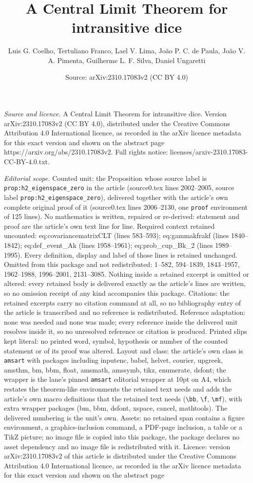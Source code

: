 \documentclass[10pt,a4paper]{amsart}
\title[A Central Limit Theorem for intransitive dice]{A Central Limit Theorem for intransitive dice}
\author{Luis G. Coelho, Tertuliano Franco, Lael V. Lima, Jo\~ao P. C. de Paula, Jo\~ao V. A. Pimenta, Guilherme L. F. Silva, Daniel Ungaretti}
\date{Source: arXiv:2310.17083v2 (CC BY 4.0)}
\begin{document}
\maketitle

\noindent\emph{Source and licence.} A Central Limit Theorem for intransitive dice. Version arXiv:2310.17083v2 (CC BY 4.0), distributed under the Creative Commons Attribution 4.0 International licence, as recorded in the arXiv licence metadata for this exact version and shown on the abstract page https://arxiv.org/abs/2310.17083v2. Full rights notice: licenses/arxiv-2310.17083-CC-BY-4.0.txt.\par\smallskip

\noindent\textit{Editorial scope.} Counted unit: the Proposition whose source label is \texttt{prop:h2\_eigenspace\_zero} in the article (source0.tex lines 2002--2005, source label \texttt{prop:h2\_eigenspace\_zero}), delivered together with the article's own complete original proof of it (source0.tex lines 2006--2130, one \texttt{proof} environment of 125 lines). No mathematics is written, repaired or re-derived: statement and proof are the article's own text line for line. Required context retained uncounted: eq:covariancematrixCLT (lines 583--593); eq:gammakfrakf (lines 1840--1842); eq:def\_event\_Ak (lines 1958--1961); eq:prob\_cup\_Bk\_2 (lines 1989--1995). Every definition, display and label of those lines is retained unchanged. Omitted from this package and not redistributed: 1--582, 594--1839, 1843--1957, 1962--1988, 1996--2001, 2131--3085. Nothing inside a retained excerpt is omitted or altered: every retained body is delivered exactly as the article's lines are written, so no omission receipt of any kind accompanies this package. Citations: the retained excerpts carry no citation command at all, so no bibliography entry of the article is transcribed and no reference is redistributed. Reference adaptation: none was needed and none was made; every reference inside the delivered unit resolves inside it, so no unresolved reference or citation is produced. Printed slips kept literal: no printed word, symbol, hypothesis or number of the counted statement or of its proof was altered. Layout and class: the article's own class is \texttt{amsart} with packages including inputenc, babel, helvet, courier, upgreek, amsthm, bm, bbm, float, amsmath, amssymb, tikz, enumerate, dsfont; the wrapper is the lane's pinned \texttt{amsart} editorial wrapper at 10pt on A4, which restates the theorem-like environments the retained text needs and adds the article's own macro definitions that the retained text needs (\texttt{\textbackslash bb}, \texttt{\textbackslash f}, \texttt{\textbackslash mf}), with extra wrapper packages (bm, bbm, dsfont, xspace, cancel, mathtools). The delivered numbering is the unit's own. Assets: no retained span contains a figure environment, a graphics-inclusion command, a PDF-page inclusion, a table or a TikZ picture; no image file is copied into this package, the package declares no asset dependency and no image file is redistributed with it. Licence: version arXiv:2310.17083v2 of this article is distributed under the Creative Commons Attribution 4.0 International licence, as recorded in the arXiv licence metadata for this exact version and shown on the abstract page 
\end{document}
